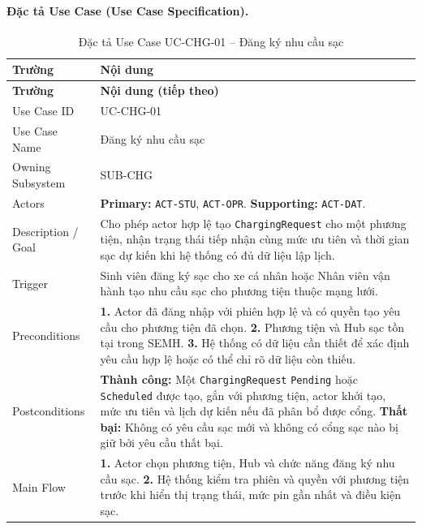 \paragraph{Đặc tả Use Case (Use Case Specification).}
\small
\begin{longtable}{|L{42mm}|L{102mm}|}
  \caption{Đặc tả Use Case UC-CHG-01 -- Đăng ký nhu cầu sạc}\label{tab:spec-UC-CHG-01}\\
  \hline
  \centering\arraybackslash\textbf{Trường} & \centering\arraybackslash\textbf{Nội dung}\\
  \hline
  \endfirsthead
  \hline
  \centering\arraybackslash\textbf{Trường} & \centering\arraybackslash\textbf{Nội dung (tiếp theo)}\\
  \hline
  \endhead
  Use Case ID & UC-CHG-01\\\hline
  Use Case Name & Đăng ký nhu cầu sạc\\\hline
  Owning Subsystem & SUB-CHG\\\hline
  Actors & \textbf{Primary:} \texttt{ACT-STU}, \texttt{ACT-OPR}. \textbf{Supporting:} \texttt{ACT-DAT}.\\\hline
  Description / Goal & Cho phép actor hợp lệ tạo \texttt{ChargingRequest} cho một phương tiện, nhận trạng thái tiếp nhận cùng mức ưu tiên và thời gian sạc dự kiến khi hệ thống có đủ dữ liệu lập lịch.\\\hline
  Trigger & Sinh viên đăng ký sạc cho xe cá nhân hoặc Nhân viên vận hành tạo nhu cầu sạc cho phương tiện thuộc mạng lưới.\\\hline
  Preconditions &
    \textbf{1.} Actor đã đăng nhập với phiên hợp lệ và có quyền tạo yêu cầu cho phương tiện đã chọn.\newline
    \textbf{2.} Phương tiện và Hub sạc tồn tại trong SEMH.\newline
    \textbf{3.} Hệ thống có dữ liệu cần thiết để xác định yêu cầu hợp lệ hoặc có thể chỉ rõ dữ liệu còn thiếu.\\\hline
  Postconditions &
    \textbf{Thành công:} Một \texttt{ChargingRequest} \texttt{Pending} hoặc \texttt{Scheduled} được tạo, gắn với phương tiện, actor khởi tạo, mức ưu tiên và lịch dự kiến nếu đã phân bổ được cổng.\newline
    \textbf{Thất bại:} Không có yêu cầu sạc mới và không có cổng sạc nào bị giữ bởi yêu cầu thất bại.\\\hline
  Main Flow &
    \textbf{1.} Actor chọn phương tiện, Hub và chức năng đăng ký nhu cầu sạc.\newline
    \textbf{2.} Hệ thống kiểm tra phiên và quyền với phương tiện trước khi hiển thị trạng thái, mức pin gần nhất và điều kiện sạc.\newline

\end{longtable}
